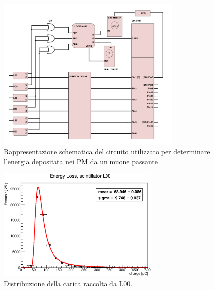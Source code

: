 \begin{figure}[H]
 	\begin{center}
 		\includegraphics[width=0.8\textwidth]{./SCHEMI/Energy.png} %
 		\caption{\small Rappresentazione schematica del circuito utilizzato per determinare l'energia depositata nei PM da un muone passante}
	 	\label{fig:circ-energy}
 	\end{center}
 \end{figure}


 \begin{figure}[H]
   \centering
   \includegraphics[width=0.7\textwidth]{plots/energy_L00.eps}
   \caption{Distribuzione della carica raccolta da L00. }
   \label{fig:L00_energy}
 \end{figure}



